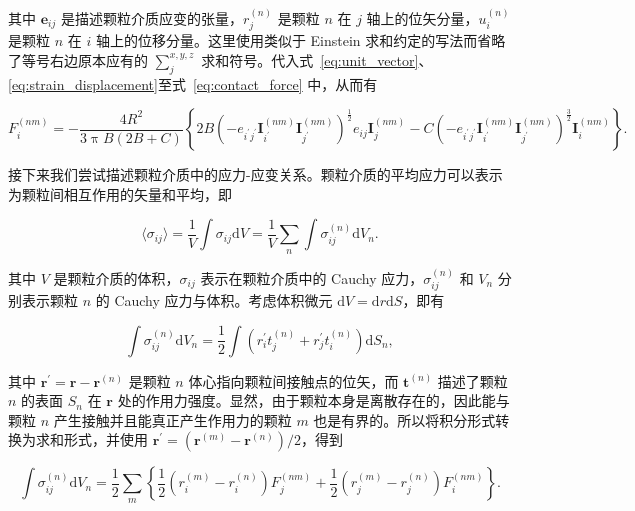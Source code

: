 其中 $\mathbf{e}_{ij}$ 是描述颗粒介质应变的张量，${r}_{j}^{(n)}$ 是颗粒 $n$ 在 $j$ 轴上的位矢分量，${u}_{i}^{(n)}$ 是颗粒 $n$ 在 $i$ 轴上的位移分量。这里使用类似于 Einstein 求和约定的写法而省略了等号右边原本应有的 $\sum_{j}^{x,y,z}$ 求和符号。代入式~\eqref{eq:unit_vector}、\eqref{eq:strain_displacement}至式~\eqref{eq:contact_force} 中，从而有

\begin{equation}
  F_{i}^{(nm)} = -\frac{4R^{2}}{3\uppi B(2B+C)}\left\{2B\left(-e_{i^{\prime}j^{\prime}}\mathbf{I}_{i^{\prime}}^{(nm)}\mathbf{I}_{j^{\prime}}^{(nm)}\right)^{\frac{1}{2}}e_{ij}\mathbf{I}_{j}^{(nm)} - C\left(-e_{i^{\prime}j^{\prime}}\mathbf{I}^{(nm)}_{i^{\prime}}\mathbf{I}_{j^{\prime}}^{(nm)}\right)^{\frac{3}{2}}\mathbf{I}_{i}^{(nm)}\right\}.
\end{equation}

接下来我们尝试描述颗粒介质中的应力-应变关系。颗粒介质的平均应力可以表示为颗粒间相互作用的矢量和平均，即

\begin{equation}
  \langle\sigma_{ij}\rangle = \frac{1}{V}\int\sigma_{ij}\mathrm{d}V = \frac{1}{V}\sum_{n}\int\sigma_{ij}^{(n)}\mathrm{d}V_{n}.
\end{equation}

其中 $V$ 是颗粒介质的体积，$\sigma_{ij}$ 表示在颗粒介质中的 Cauchy 应力，$\sigma_{ij}^{(n)}$ 和 $V_{n}$ 分别表示颗粒 $n$ 的 Cauchy 应力与体积。考虑体积微元 $\mathrm{d}V = \mathrm{d}r\mathrm{d}S$，即有

\begin{equation}
  \int\sigma_{ij}^{(n)}\mathrm{d}V_{n} = \frac{1}{2}\int\left(r_{i}^{\prime}t_{j}^{(n)} + r_{j}^{\prime}t_{i}^{(n)}\right)\mathrm{d}S_{n},
\end{equation}

其中 $\mathbf{r}^{\prime} = \mathbf{r} - \mathbf{r}^{(n)} $ 是颗粒 $n$ 体心指向颗粒间接触点的位矢，而 $\mathbf{t}^{(n)}$ 描述了颗粒 $n$ 的表面 $S_{n}$ 在 $\mathbf{r}$ 处的作用力强度。显然，由于颗粒本身是离散存在的，因此能与颗粒 $n$ 产生接触并且能真正产生作用力的颗粒 $m$ 也是有界的。所以将积分形式转换为求和形式，并使用 $\mathbf{r}^{\prime} = \left(\mathbf{r}^{(m)} - \mathbf{r}^{(n)}\right)/2$，得到

\begin{equation}
  \int\sigma_{ij}^{(n)}\mathrm{d}V_{n} = \frac{1}{2}\sum_{m}\left\{\frac{1}{2}\left(r_{i}^{(m)} - r_{i}^{(n)}\right)F_{j}^{(nm)} + \frac{1}{2}\left(r_{j}^{(m)} - r_{j}^{(n)}\right)F_{i}^{(nm)}\right\}\label{eq:cauchy_tensor}.
\end{equation}

